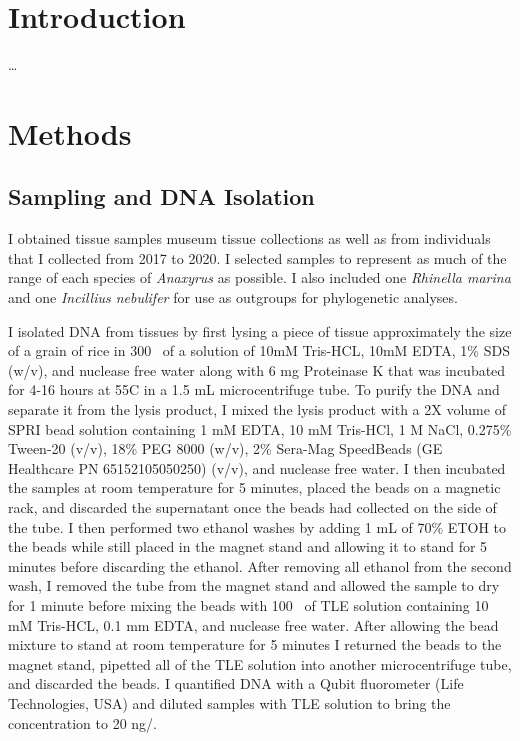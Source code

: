 \section{Introduction}
\ldots
\section{Methods}
\subsection{Sampling and DNA Isolation}
I obtained tissue samples museum tissue collections as well as from individuals   
that I collected from 2017 to 2020. I selected samples to represent as much
of the range of each species of \textit{Anaxyrus} as possible.
I also included one \textit{Rhinella marina} and one \textit{Incillius nebulifer} 
for use as outgroups for phylogenetic analyses.

I isolated DNA from tissues by first lysing a piece of tissue approximately 
the size of a grain of rice in 300 \uL\ of a solution of 10mM Tris-HCL, 10mM EDTA, 
1\% SDS (w/v), and nuclease free water along with 6 mg Proteinase K that was 
incubated for 4-16 hours at 55\degree C in a 1.5 mL microcentrifuge tube.  
To purify the DNA and separate it from the lysis product, I mixed the lysis 
product with a 2X volume of SPRI bead solution containing 1 mM EDTA,  
10 mM Tris-HCl, 1 M NaCl, 0.275\% Tween-20 (v/v), 18\% PEG 8000 (w/v), 
2\% Sera-Mag SpeedBeads (GE Healthcare PN 65152105050250) (v/v), and nuclease free water.
I then incubated the samples at room temperature for 5 minutes, placed the 
beads on a magnetic rack, and discarded the supernatant once the beads had collected
on the side of the tube.  
I then performed two ethanol washes by adding 1 mL of 70\% ETOH to the beads
while still placed in the magnet stand and allowing it to stand for 5 minutes
before discarding the ethanol. 
After removing all ethanol from the second wash, I removed the tube from the magnet 
stand and allowed the sample to dry for 1 minute before mixing the beads with 100 \uL\ of 
TLE solution containing 10 mM Tris-HCL, 0.1 mm EDTA, and nuclease free water.
After allowing the bead mixture to stand at room temperature for 5 minutes I returned
the beads to the magnet stand, pipetted all of the TLE solution into another 
microcentrifuge tube, and discarded the beads. I quantified DNA with a Qubit
fluorometer (Life Technologies, USA) and diluted samples with TLE solution to 
bring the concentration to 20 ng/\uL.

